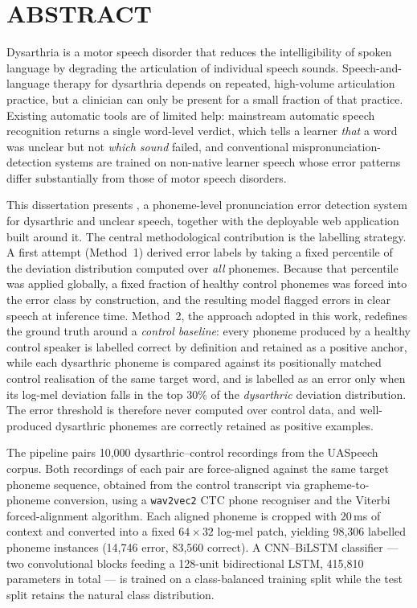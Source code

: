 \chapter*{ABSTRACT}

Dysarthria is a motor speech disorder that reduces the intelligibility of
spoken language by degrading the articulation of individual speech sounds.
Speech-and-language therapy for dysarthria depends on repeated, high-volume
articulation practice, but a clinician can only be present for a small fraction
of that practice. Existing automatic tools are of limited help: mainstream
automatic speech recognition returns a single word-level verdict, which tells a
learner \emph{that} a word was unclear but not \emph{which sound} failed, and
conventional mispronunciation-detection systems are trained on non-native
learner speech whose error patterns differ substantially from those of motor
speech disorders.

This dissertation presents \systemName, a phoneme-level pronunciation error
detection system for dysarthric and unclear speech, together with the deployable
web application built around it. The central methodological contribution is the
labelling strategy. A first attempt (Method~1) derived error labels by taking a
fixed percentile of the deviation distribution computed over \emph{all}
phonemes. Because that percentile was applied globally, a fixed fraction of
healthy control phonemes was forced into the error class by construction, and
the resulting model flagged errors in clear speech at inference time. Method~2,
the approach adopted in this work, redefines the ground truth around a
\emph{control baseline}: every phoneme produced by a healthy control speaker is
labelled correct by definition and retained as a positive anchor, while each
dysarthric phoneme is compared against its positionally matched control
realisation of the same target word, and is labelled as an error only when its
log-mel deviation falls in the top 30\% of the \emph{dysarthric} deviation
distribution. The error threshold is therefore never computed over control data,
and well-produced dysarthric phonemes are correctly retained as positive
examples.

The pipeline pairs 10{,}000 dysarthric--control recordings from the UASpeech
corpus. Both recordings of each pair are force-aligned against the same target
phoneme sequence, obtained from the control transcript via
grapheme-to-phoneme conversion, using a \texttt{wav2vec2} CTC phone recogniser
and the Viterbi forced-alignment algorithm. Each aligned phoneme is cropped with
20\,ms of context and converted into a fixed $64 \times 32$ log-mel patch,
yielding 98{,}306 labelled phoneme instances (14{,}746 error, 83{,}560 correct).
A CNN--BiLSTM classifier --- two convolutional blocks feeding a
128-unit bidirectional LSTM, 415{,}810 parameters in total --- is trained on a
class-balanced training split while the test split retains the natural class
distribution.

